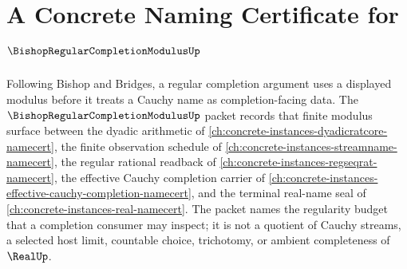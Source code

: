 \chapter{A Concrete Naming Certificate for $\BishopRegularCompletionModulusUp$}
\label{ch:concrete-instances-bishop-regular-completion-modulus-namecert}

Following Bishop and Bridges, a regular completion argument uses a displayed modulus before it treats a Cauchy name as completion-facing data. The $\BishopRegularCompletionModulusUp$ packet records that finite modulus surface between the dyadic arithmetic of \autoref{ch:concrete-instances-dyadicratcore-namecert}, the finite observation schedule of \autoref{ch:concrete-instances-streamname-namecert}, the regular rational readback of \autoref{ch:concrete-instances-regseqrat-namecert}, the effective Cauchy completion carrier of \autoref{ch:concrete-instances-effective-cauchy-completion-namecert}, and the terminal real-name seal of \autoref{ch:concrete-instances-real-namecert}. The packet names the regularity budget that a completion consumer may inspect; it is not a quotient of Cauchy streams, a selected host limit, countable choice, trichotomy, or ambient completeness of $\RealUp$.

